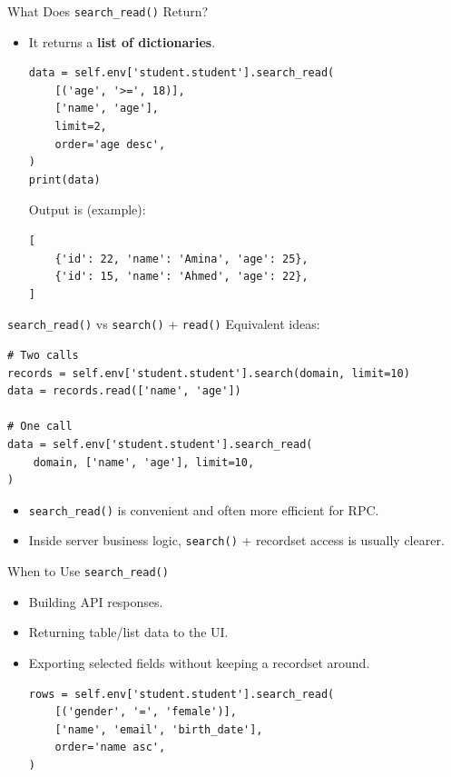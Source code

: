 \begin{frame}[fragile]{What Does \texttt{search\_read()} Return?}
	\begin{block}{}
		\begin{itemize}
			\item It returns a \textbf{list of dictionaries}.
\begin{lstlisting}
data = self.env['student.student'].search_read(
	[('age', '>=', 18)],
	['name', 'age'],
	limit=2,
	order='age desc',
)
print(data)
\end{lstlisting}
			Output is (example):
\begin{lstlisting}
[
	{'id': 22, 'name': 'Amina', 'age': 25},
	{'id': 15, 'name': 'Ahmed', 'age': 22},
]
\end{lstlisting}
		\end{itemize}
	\end{block}
\end{frame}

\begin{frame}[fragile]{\texttt{search\_read()} vs \texttt{search()} + \texttt{read()}}
	Equivalent ideas:
\begin{lstlisting}
# Two calls
records = self.env['student.student'].search(domain, limit=10)
data = records.read(['name', 'age'])

# One call
data = self.env['student.student'].search_read(
	domain, ['name', 'age'], limit=10,
)
\end{lstlisting}
	\begin{itemize}
		\item \texttt{search\_read()} is convenient and often more efficient for RPC.
		\item Inside server business logic, \texttt{search()} + recordset access is usually clearer.
	\end{itemize}
\end{frame}

\begin{frame}[fragile]{When to Use \texttt{search\_read()}}
	\begin{itemize}
		\item Building API responses.
		\item Returning table/list data to the UI.
		\item Exporting selected fields without keeping a recordset around.
\begin{lstlisting}
rows = self.env['student.student'].search_read(
	[('gender', '=', 'female')],
	['name', 'email', 'birth_date'],
	order='name asc',
)
\end{lstlisting}
	\end{itemize}
\end{frame}

